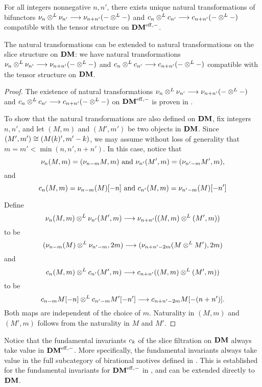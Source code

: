 \begin{cor}
For all integers nonnegative $n, n'$, there exists unique
natural transformations of bifunctors $\sliceDM{n} \tDM 
\sliceDM{n'} \to \sliceDM{n + n'}(- \tDM -)$ and $\fIDM{n} \tDM
\fIDM{n'} \to \fIDM{n + n'}(- \tDM -)$ compatible with the tensor 
structure on $\DMeff$.

The natural transformations can be extended to natural 
transformations on the slice structure on $\DM$: we have natural 
transformations $\sliceDM{n} \tDM \sliceDM{n'} \to 
\sliceDM{n + n'}(- \tDM -)$ and $\fIDM{n} \tDM \fIDM{n'} \to 
\fIDM{n + n'}(- \tDM -)$ compatible with the tensor structure on 
$\DM$.
\end{cor}
\begin{proof}
The existence of natural transformations $\sliceDM{n} \tDM 
\sliceDM{n'} \to \sliceDM{n + n'}(- \tDM -)$ and $\fIDM{n} \tDM 
\fIDM{n'} \to \fIDM{n + n'}(- \tDM -)$ on $\DMeff$ is proven
in \cite[1.6]{HuKa}.

To show that the natural transformations are also defined on 
$\DM$, fix integers $n, n'$, and let $(M, m)$ and $(M', m')$ be 
two objects in $\DM$. Since $(M',m') \cong (\tZ[k]M', m' - k)$, 
we may assume without loss of generality that $m = m' < 
\min(n, n', n + n')$. In this case, notice that
\[
\sliceDM{n}(M, m) = (\sliceDM{n - m}M, m) 
\textrm{ and }
\sliceDM{n'}(M', m) = (\sliceDM{n' - m}M', m),
\]
and
\[
\fIDM{n}(M, m) = \sliceDM{n - m}(M)[-n]
\textrm{ and }
\fIDM{n'}(M, m) = \sliceDM{n' - m}(M)[-n']
\]

Define
\[
\sliceDM{n}(M, m) \tDM \sliceDM{n'}(M',m)
\to \sliceDM{n + n'}((M, m) \tDM (M',m))
\]
to be
\[
(\sliceDM{n - m}(M) \tDM \sliceDM{n' - m}, 2m) \to
   (\sliceDM{n + n' - 2m}(M \tDM M'), 2m)
\]
and
\[
\fIDM{n}(M, m) \tDM \fIDM{n'}(M',m)
\to \fIDM{n + n'}((M, m) \tDM (M',m))
\]
to be
\[
\fIDM{n - m}M[-n] \tDM \fIDM{n' - m}M'[-n']
\to \fIDM{n + n' - 2m}M[-(n + n')].
\]
Both maps are independent of the choice of $m$. Naturality in 
$(M, m)$ and $(M', m)$ follows from the naturality in $M$ and 
$M'$.
\end{proof}

\begin{rmk}
Notice that the fundamental invariants $\fIDM{k}$ of the slice 
filtration on $\DM$ always take value in $\DMeff$. More 
specifically, the fundamental invariants always take value in the 
full subcategory of birational motives defined in \cite{KaSu}. 
This is established for the fundamental invariants for $\DMeff$ 
in \cite[Section 2]{HuKa}, and can be extended directly to $\DM$.
\end{rmk}
